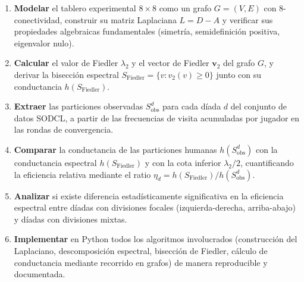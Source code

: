 \documentclass[journal]{IEEEtran}
\begin{document}
\begin{enumerate}

  \item \textbf{Modelar} el tablero experimental $8\times 8$ como un grafo
        $G=(V,E)$ con 8-conectividad, construir su matriz Laplaciana $L=D-A$ y
        verificar sus propiedades algebraicas fundamentales (simetría, semidefinición
        positiva, eigenvalor nulo).

  \item \textbf{Calcular} el valor de Fiedler $\lambda_2$ y el vector de Fiedler
        $\mathbf{v}_2$ del grafo $G$, y derivar la bisección espectral
        $S_{\text{Fiedler}}=\{v: v_2(v)\ge 0\}$ junto con su conductancia
        $h(S_{\text{Fiedler}})$.

  \item \textbf{Extraer} las particiones observadas $S_{\text{obs}}^d$ para cada
        díada $d$ del conjunto de datos SODCL, a partir de las frecuencias de visita
        acumuladas por jugador en las rondas de convergencia.

  \item \textbf{Comparar} la conductancia de las particiones humanas
        $h(S_{\text{obs}}^d)$ con la conductancia espectral $h(S_{\text{Fiedler}})$ y
        con la cota inferior $\lambda_2/2$, cuantificando la eficiencia relativa
        mediante el ratio $\eta_d = h(S_{\text{Fiedler}})/h(S_{\text{obs}}^d)$.

  \item \textbf{Analizar} si existe diferencia estadísticamente significativa en la
        eficiencia espectral entre díadas con divisiones focales (izquierda-derecha,
        arriba-abajo) y díadas con divisiones mixtas.

  \item \textbf{Implementar} en Python todos los algoritmos involucrados (construcción
        del Laplaciano, descomposición espectral, bisección de Fiedler, cálculo de
        conductancia mediante recorrido en grafos) de manera reproducible y documentada.

\end{enumerate}
\end{document}
